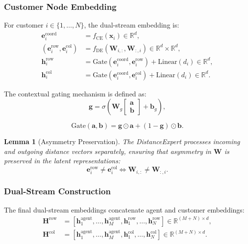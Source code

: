 \documentclass[journal,twoside,web]{ieeecolor}
\newtheorem{lemma}[theorem]{Lemma}
\theoremstyle{definition}
\theoremstyle{remark}
\theoremstyle{definition}
\begin{document}
\subsubsection{Customer Node Embedding}
For customer $i \in \{1,\ldots,N\}$, the dual-stream embedding is:
\begin{align}
\mathbf{e}^{\text{coord}}_i &= f_{\text{CE}}(\mathbf{x}_i) \in \mathbb{R}^d, \\
(\mathbf{e}^{\text{row}}_i, \mathbf{e}^{\text{col}}_i) &= f_{\text{DE}}(\mathbf{W}_{i,:}, \mathbf{W}_{:,i}) \in \mathbb{R}^d \times \mathbb{R}^d, \\
\mathbf{h}^{\text{row}}_i &= \text{Gate}(\mathbf{e}^{\text{coord}}_i, \mathbf{e}^{\text{row}}_i) + \text{Linear}(d_i) \in \mathbb{R}^d, \\
\mathbf{h}^{\text{col}}_i &= \text{Gate}(\mathbf{e}^{\text{coord}}_i, \mathbf{e}^{\text{col}}_i) + \text{Linear}(d_i) \in \mathbb{R}^d.
\end{align}

The contextual gating mechanism is defined as:
\begin{equation}
\mathbf{g}
=
\sigma\!\left(
\mathbf{W}_g
\begin{bmatrix}
\mathbf{a}\\
\mathbf{b}
\end{bmatrix}
+\mathbf{b}_g
\right),
\end{equation}

\begin{equation}
\text{Gate}(\mathbf{a},\mathbf{b})
=
\mathbf{g}\odot\mathbf{a}
+
(1-\mathbf{g})\odot\mathbf{b}.
\end{equation}

\begin{lemma}[Asymmetry Preservation]
The DistanceExpert processes incoming and outgoing distance vectors separately, ensuring that asymmetry in $\mathbf{W}$ is preserved in the latent representations:
\begin{equation}
\mathbf{e}^{\text{row}}_i \neq \mathbf{e}^{\text{col}}_i \iff \mathbf{W}_{i,:} \neq \mathbf{W}_{:,i}.
\end{equation}
\end{lemma}

\subsubsection{Dual-Stream Construction}
The final dual-stream embeddings concatenate agent and customer embeddings:
\begin{align}
\mathbf{H}^{\text{row}} &= [\mathbf{h}^{\text{agent}}_1, \ldots, \mathbf{h}^{\text{agent}}_M, \mathbf{h}^{\text{row}}_1, \ldots, \mathbf{h}^{\text{row}}_N] \in \mathbb{R}^{(M+N) \times d}, \\
\mathbf{H}^{\text{col}} &= [\mathbf{h}^{\text{agent}}_1, \ldots, \mathbf{h}^{\text{agent}}_M, \mathbf{h}^{\text{col}}_1, \ldots, \mathbf{h}^{\text{col}}_N] \in \mathbb{R}^{(M+N) \times d}.
\end{align}
\end{document}
